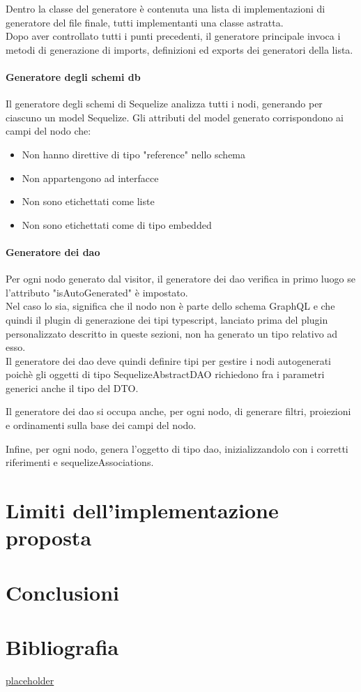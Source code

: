 \documentclass[a4paper, 12pt]{scrartcl}
\begin{document}
      Dentro la classe del generatore è contenuta una lista di implementazioni di generatore del file finale, tutti implementanti una classe astratta.\\
      Dopo aver controllato tutti i punti precedenti, il generatore principale invoca i metodi di generazione di imports, definizioni ed exports dei generatori della lista.

      \paragraph*{Generatore degli schemi db}
      Il generatore degli schemi di Sequelize analizza tutti i nodi, generando per ciascuno un model Sequelize.
      Gli attributi del model generato corrispondono ai campi del nodo che:
      \begin{itemize}
        \item Non hanno direttive di tipo "reference" nello schema
        \item Non appartengono ad interfacce
        \item Non sono etichettati come liste
        \item Non sono etichettati come di tipo embedded
      \end{itemize}

      \paragraph*{Generatore dei dao}
      Per ogni nodo generato dal visitor, il generatore dei dao verifica in primo luogo se l'attributo "isAutoGenerated" è impostato.\\
      Nel caso lo sia, significa che il nodo non è parte dello schema GraphQL e che quindi il plugin di generazione dei tipi typescript, lanciato prima del plugin personalizzato descritto in queste sezioni, non ha generato un tipo relativo ad esso.\\
      Il generatore dei dao deve quindi definire tipi per gestire i nodi autogenerati poichè gli oggetti di tipo SequelizeAbstractDAO richiedono fra i parametri generici anche il tipo del DTO.

      Il generatore dei dao si occupa anche, per ogni nodo, di generare filtri, proiezioni e ordinamenti sulla base dei campi del nodo.

      Infine, per ogni nodo, genera l'oggetto di tipo dao, inizializzandolo con i corretti riferimenti e sequelizeAssociations.

    \newpage
    \section*{Limiti dell'implementazione proposta}

    \newpage
    \section*{Conclusioni}

    \newpage
    \section*{Bibliografia}
          \href{https://hostname.com}{placeholder} \\
\end{document}

